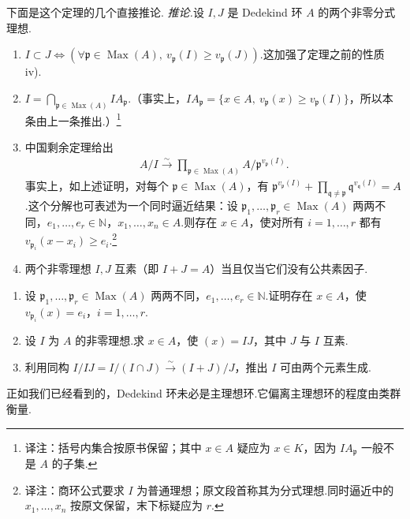 下面是这个定理的几个直接推论.
\emph{推论.}设 $I,J$ 是 Dedekind 环 $A$ 的两个非零分式理想.
\begin{enumerate}[label=\roman*)]
\item $I\subset J\Longleftrightarrow(\forall\mathfrak p\in\operatorname{Max}(A),\ v_{\mathfrak p}(I)\ge v_{\mathfrak p}(J))$.这加强了定理之前的性质 iv).
\item $I=\bigcap_{\mathfrak p\in\operatorname{Max}(A)}IA_{\mathfrak p}$.（事实上，$IA_{\mathfrak p}=\{x\in A,\ v_{\mathfrak p}(x)\ge v_{\mathfrak p}(I)\}$，所以本条由上一条推出.）\footnote{译注：括号内集合按原书保留；其中 $x\in A$ 疑应为 $x\in K$，因为 $IA_{\mathfrak p}$ 一般不是 $A$ 的子集.}
\item 中国剩余定理给出
\begin{align*}
A/I\xrightarrow{\sim}\prod_{\mathfrak p\in\operatorname{Max}(A)}A/\mathfrak p^{v_{\mathfrak p}(I)}.
\end{align*}
事实上，如上述证明，对每个 $\mathfrak p\in\operatorname{Max}(A)$，有 $\mathfrak p^{v_{\mathfrak p}(I)}+\prod_{\mathfrak q\ne\mathfrak p}\mathfrak q^{v_{\mathfrak q}(I)}=A$.这个分解也可表述为一个同时逼近结果：设 $\mathfrak p_1,\ldots,\mathfrak p_r\in\operatorname{Max}(A)$ 两两不同，$e_1,\ldots,e_r\in\mathbb N$，$x_1,\ldots,x_n\in A$.则存在 $x\in A$，使对所有 $i=1,\ldots,r$ 都有 $v_{\mathfrak p_i}(x-x_i)\ge e_i$.\footnote{译注：商环公式要求 $I$ 为普通理想；原文段首称其为分式理想.同时逼近中的 $x_1,\ldots,x_n$ 按原文保留，末下标疑应为 $r$.}
\item 两个非零理想 $I,J$ 互素（即 $I+J=A$）当且仅当它们没有公共素因子.
\end{enumerate}
\begin{exercise*}
\begin{enumerate}[label=\roman*)]
\item 设 $\mathfrak p_1,\ldots,\mathfrak p_r\in\operatorname{Max}(A)$ 两两不同，$e_1,\ldots,e_r\in\mathbb N$.证明存在 $x\in A$，使 $v_{\mathfrak p_i}(x)=e_i$，$i=1,\ldots,r$.
\item 设 $I$ 为 $A$ 的非零理想.求 $x\in A$，使 $(x)=IJ$，其中 $J$ 与 $I$ 互素.
\item 利用同构 $I/IJ=I/(I\cap J)\xrightarrow{\sim}(I+J)/J$，推出 $I$ 可由两个元素生成.
\end{enumerate}
\end{exercise*}
正如我们已经看到的，Dedekind 环未必是主理想环.它偏离主理想环的程度由类群衡量.
